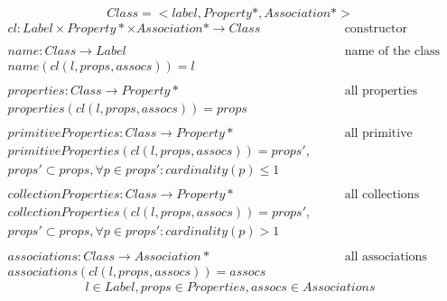 \documentclass[11pt]{article}
\begin{document}
$$Class = <label, Property*, Association*>$$
\begin{equation*}
\begin{alignat}{2}
cl : Label \times Property* \times Association* \rightarrow Class &\quad&\text{constructor}\\ \\
name : Class \rightarrow Label &\quad&\text{name of the class}\\
name(cl(l, props, assocs)) = l \\ \\
properties : Class \rightarrow Property* &\quad&\text{all properties}\\
properties(cl(l, props, assocs)) = props \\ \\
primitiveProperties : Class \rightarrow Property* &\quad&\text{all primitive properties}\\
primitiveProperties(cl(l, props, assocs)) = props', \\ props' \subset props,  \forall p \in props' : cardinality(p) \leq 1 \\ \\
collectionProperties : Class \rightarrow Property* &\quad&\text{all collections}\\
collectionProperties(cl(l, props, assocs)) = props', \\ props' \subset props, \forall p \in props' : cardinality(p) > 1 \\ \\
associations : Class \rightarrow Association* &\quad&\text{all associations}\\
associations(cl(l, props, assocs)) = assocs
\end{alignat}
\end{equation*}
$$l \in Label, props \in Properties, assocs \in Associations$$
	 
\end{document}
